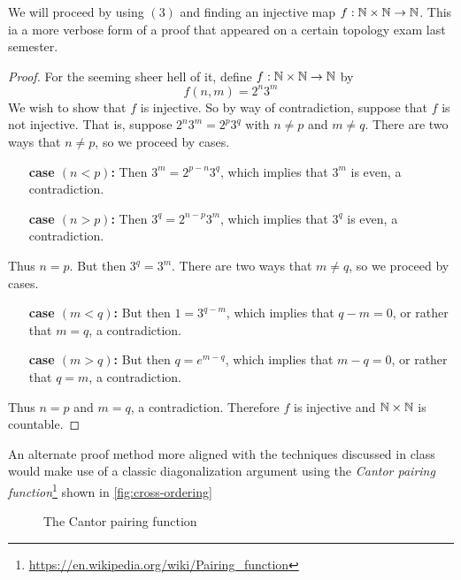 \documentclass{article}
\begin{document}
We will proceed by using $(3)$ and finding an injective map $f : \mathbb{N} \times \mathbb{N} \to \mathbb{N}$. This ia a
more verbose form of a proof that appeared on a certain topology exam last semester.

\begin{proof}
    For the seeming sheer hell of it, define $f : \mathbb{N} \times \mathbb{N} \to \mathbb{N}$ by
    \[f(n, m) = 2^n 3^m\]
    We wish to show that $f$ is injective. So by way of contradiction, suppose that $f$ is not
    injective. That is, suppose $2^n3^m = 2^p3^q$ with $n \neq p$ and $m \neq q$. There are two
    ways that $n \neq p$, so we proceed by cases.
    \begin{itemize}
        \item[\textbf{case $(n < p)$:}] Then $3^m = 2^{p - n}3^q$, which implies that $3^m$ is
              even, a contradiction.
        \item[\textbf{case $(n > p)$:}] Then $3^q = 2^{n - p}3^m$, which implies that $3^q$ is
              even, a contradiction.
    \end{itemize}
    Thus $n = p$. But then $3^q = 3^m$. There are two ways that $m \neq q$, so we proceed by cases.
    \begin{itemize}
        \item[\textbf{case $(m < q)$:}] But then $1 = 3^{q - m}$, which implies that $q - m = 0$,
              or rather that $m = q$, a contradiction.
        \item[\textbf{case $(m > q)$:}] But then $q = e^{m - q}$, which implies that $m - q = 0$,
              or rather that $q = m$, a contradiction.
    \end{itemize}
    Thus $n = p$ and $m = q$, a contradiction. Therefore $f$ is injective and $\mathbb{N} \times \mathbb{N}$ is
    countable.
\end{proof}

An alternate proof method more aligned with the techniques discussed in class would make use of a
classic diagonalization argument using the \textit{Cantor pairing
    function}\footnote{\url{https://en.wikipedia.org/wiki/Pairing_function}} shown in
\autoref{fig:cross-ordering}
\begin{figure}[h]
    \centering
    \caption{The Cantor pairing function}\label{fig:cross-ordering}
\end{figure}
\end{document}
